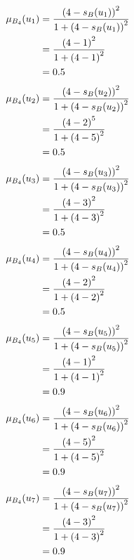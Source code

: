\documentclass[a4paper]{book}
\begin{document}
				\\
				\\
				\\
				\begin{align}
					\mu_{B_4}(u_1) &= \frac{\left(4-s_B(u_1)\right)^2}{1 + \left(4-s_B(u_1)\right)^2}\\
					&= \frac{\left(4-1\right)^2}{1 + \left(4-1\right)^2} \notag \\
					&= 0.5 \notag
				\end{align}
				\begin{align}
					\mu_{B_4}(u_2) &= \frac{\left(4-s_B(u_2)\right)^2}{1 + \left(4-s_B(u_2)\right)^2}\\
					&= \frac{\left(4-2\right)^5}{1 + \left(4-5\right)^2} \notag \\
					&= 0.5 \notag
				\end{align}
				\begin{align}
					\mu_{B_4}(u_3) &= \frac{\left(4-s_B(u_3)\right)^2}{1 + \left(4-s_B(u_3)\right)^2}\\
					&= \frac{\left(4-3\right)^2}{1 + \left(4-3\right)^2} \notag \\
					&= 0.5 \notag
				\end{align}
				\begin{align}
					\mu_{B_4}(u_4) &= \frac{\left(4-s_B(u_4)\right)^2}{1 + \left(4-s_B(u_4)\right)^2}\\
					&= \frac{\left(4-2\right)^2}{1 + \left(4-2\right)^2} \notag \\
					&= 0.5 \notag
				\end{align}
				\begin{align}
					\mu_{B_4}(u_5) &= \frac{\left(4-s_B(u_5)\right)^2}{1 + \left(4-s_B(u_5)\right)^2}\\
					&= \frac{\left(4-1\right)^2}{1 + \left(4-1\right)^2} \notag \\
					&= 0.9 \notag
				\end{align}
				\begin{align}
					\mu_{B_4}(u_6) &= \frac{\left(4-s_B(u_6)\right)^2}{1 + \left(4-s_B(u_6)\right)^2}\\
					&= \frac{\left(4-5\right)^2}{1 + \left(4-5\right)^2} \notag \\
					&= 0.9 \notag
				\end{align}
				\begin{align}
					\mu_{B_4}(u_7) &= \frac{\left(4-s_B(u_7)\right)^2}{1 + \left(4-s_B(u_7)\right)^2}\\
					&= \frac{\left(4-3\right)^2}{1 + \left(4-3\right)^2} \notag \\
					&= 0.9 \notag
				\end{align}
\end{document}
